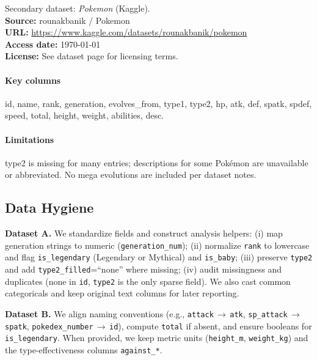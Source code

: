 \documentclass[11pt]{article}
\begin{document}
Secondary dataset: \emph{Pokemon} (Kaggle).\\
\textbf{Source:} rounakbanik / Pokemon\\
\textbf{URL:} \url{https://www.kaggle.com/datasets/rounakbanik/pokemon}\\
\textbf{Access date:} \today\\
\textbf{License:} See dataset page for licensing terms.

\paragraph{Key columns} id, name, rank, generation, evolves\_from, type1, type2, hp, atk, def, spatk, spdef, speed, total, height, weight, abilities, desc.

\paragraph{Limitations} type2 is missing for many entries; descriptions for some Pokémon are unavailable or abbreviated. No mega evolutions are included per dataset notes.

\subsection*{Data Hygiene}
\textbf{Dataset A.} We standardize fields and construct analysis helpers: (i) map generation strings to numeric (\texttt{generation\_num}); (ii) normalize \texttt{rank} to lowercase and flag \texttt{is\_legendary} (Legendary or Mythical) and \texttt{is\_baby}; (iii) preserve \texttt{type2} and add \texttt{type2\_filled}=``none'' where missing; (iv) audit missingness and duplicates (none in \texttt{id}, \texttt{type2} is the only sparse field). We also cast common categoricals and keep original text columns for later reporting.

\textbf{Dataset B.} We align naming conventions (e.g., \texttt{attack}\,$\to$\,\texttt{atk}, \texttt{sp\_attack}\,$\to$\,\texttt{spatk}, \texttt{pokedex\_number}\,$\to$\,\texttt{id}), compute \texttt{total} if absent, and ensure booleans for \texttt{is\_legendary}. When provided, we keep metric units (\texttt{height\_m}, \texttt{weight\_kg}) and the type-effectiveness columns \texttt{against\_*}.
\end{document}
